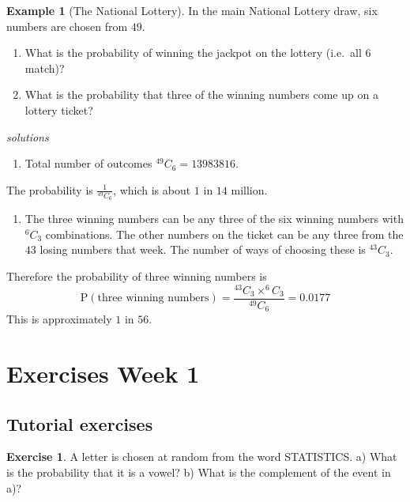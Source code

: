 \documentclass[
]{book}
\providecommand{\tightlist}{%
  \setlength{\itemsep}{0pt}\setlength{\parskip}{0pt}}
\theoremstyle{definition}
\theoremstyle{definition}
\newtheorem{example}{Example}[chapter]
\theoremstyle{definition}
\newtheorem{exercise}{Exercise}[chapter]
\theoremstyle{definition}
\theoremstyle{remark}
\begin{document}
\begin{example}[The National Lottery]
In the main National Lottery draw, six numbers are chosen from \(49\).

\begin{enumerate}
\def\labelenumi{\alph{enumi})}
\item
  What is the probability of winning the jackpot on the lottery (i.e.~all \(6\) match)?
\item
  What is the probability that three of the winning numbers come up on a lottery ticket?
\end{enumerate}

\emph{solutions}

\begin{enumerate}
\def\labelenumi{\alph{enumi})}
\tightlist
\item
  Total number of outcomes \({}^{49}C_{6} = 13983816\).
\end{enumerate}

The probability is \(\frac{1}{^{49}C_{6}}\), which is about \(1\) in \(14\) million.

\begin{enumerate}
\def\labelenumi{\alph{enumi})}
\setcounter{enumi}{1}
\tightlist
\item
  The three winning numbers can be any three of the six winning numbers with \(^6C_3\) combinations. The other numbers on the ticket can be any three from the \(43\) losing numbers that week. The number of ways of choosing these is \(^{43}C_3\).
\end{enumerate}

Therefore the probability of three winning numbers is
\[\text{P}(\text{three winning numbers}) = \frac{^{43}C_3 \times ^6C_3}{^{49}C_6} = 0.0177\]
This is approximately \(1\) in \(56\).
\end{example}

\hypertarget{exercises-week-1}{%
\section{Exercises Week 1}\label{exercises-week-1}}

\hypertarget{tutorial-exercises}{%
\subsection{Tutorial exercises}\label{tutorial-exercises}}

\begin{exercise}
A letter is chosen at random from the word STATISTICS.
a) What is the probability that it is a vowel?
b) What is the complement of the event in a)?
\end{exercise}
\end{document}
